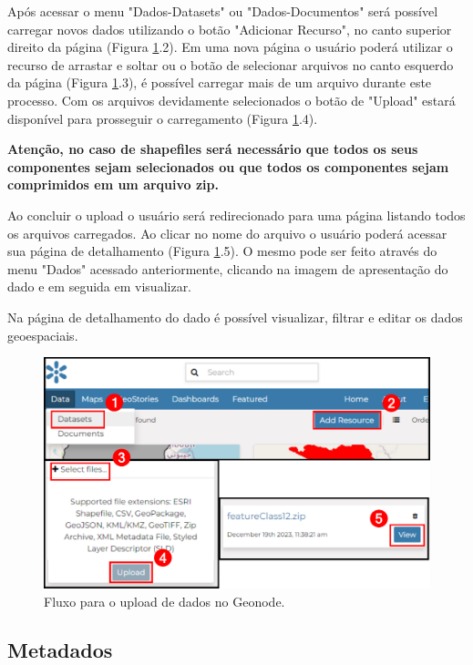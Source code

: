 \documentclass[12pt]{article}
\begin{document}
Após acessar o menu "Dados-Datasets" ou "Dados-Documentos" será possível
carregar novos dados utilizando o botão "Adicionar Recurso", no canto superior
direito da página (Figura \ref{fig:upload}.2). Em uma nova página o usuário
poderá utilizar o recurso de arrastar e soltar ou o botão de selecionar
arquivos no canto esquerdo da página (Figura \ref{fig:upload}.3), é possível
carregar mais de um arquivo durante este processo. Com os arquivos devidamente
selecionados o botão de "Upload" estará disponível para prosseguir o
carregamento (Figura \ref{fig:upload}.4). 

\textbf{Atenção, no caso de shapefiles será necessário que todos os seus
componentes sejam selecionados ou que todos os componentes sejam comprimidos em
um arquivo zip.}

Ao concluir o upload o usuário será redirecionado para uma página listando
todos os arquivos carregados. Ao clicar no nome do arquivo o usuário poderá
acessar sua página de detalhamento (Figura \ref{fig:upload}.5). O mesmo pode
ser feito através do menu "Dados" acessado anteriormente, clicando na imagem de
apresentação do dado e em seguida em visualizar.

Na página de detalhamento do dado é possível visualizar, filtrar e editar os
dados geoespaciais.

\begin{figure}[h]
  \centering
  \includegraphics[width=\textwidth, keepaspectratio]{img/upload.pdf}
  \caption{Fluxo para o upload de dados no Geonode.}
  \label{fig:upload}
\end{figure}

\subsection{Metadados}
\end{document}
